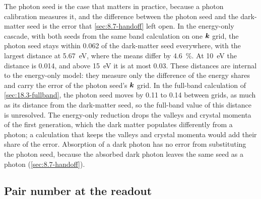 The photon seed is the case that matters in practice, because a photon calibration measures it, and the difference between the photon seed and the dark-matter seed is the error that \cref{sec:8.7-handoff} left open. In the energy-only cascade, with both seeds from the same band calculation on one $\bm{k}$ grid, the photon seed stays within 0.062 of the dark-matter seed everywhere, with the largest distance at \SI{5.67}{eV}, where the means differ by \SI{4.6}{\percent}. At \SI{10}{eV} the distance is 0.014, and above \SI{15}{eV} it is at most 0.03. These distances are internal to the energy-only model: they measure only the difference of the energy shares and carry the error of the photon seed's $\bm{k}$ grid. In the full-band calculation of \cref{sec:18.3-fullband}, the photon seed moves by 0.11 to 0.14 between grids, as much as its distance from the dark-matter seed, so the full-band value of this distance is unresolved. The energy-only reduction drops the valleys and crystal momenta of the first generation, which the dark matter populates differently from a photon; a calculation that keeps the valleys and crystal momenta would add their share of the error. Absorption of a dark photon has no error from substituting the photon seed, because the absorbed dark photon leaves the same seed as a photon (\cref{sec:8.7-handoff}).

\subsection{Pair number at the readout}\label{sec:18.3-observable}

